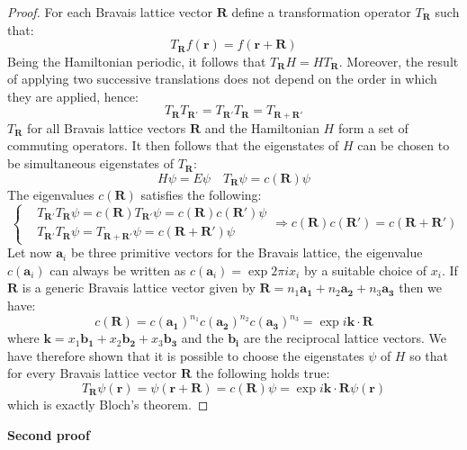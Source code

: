 \documentclass[10.75pt,a4paper,openright,bottom=2cm]{article}
\renewcommand{\Vec}[1]{\boldsymbol{#1}}
\begin{document}
\begin{proof}
For each Bravais lattice vector $\Vec{R}$ define a transformation operator $T_{\Vec{R}}$ such that:
\[
T_{\Vec{R}}f(\Vec{r})=f(\Vec{r}+\Vec{R})
\]
Being the Hamiltonian periodic, it follows that $T_{\Vec{R}}H=HT_{\Vec{R}}$. Moreover, the result of applying two successive translations does not depend on the order in which they are applied, hence:
\[
T_{\Vec{R}}T_{\Vec{R'}}=T_{\Vec{R'}}T_{\Vec{R}}=T_{\Vec{R}+\Vec{R'}}
\]
$T_{\Vec{R}}$ for all Bravais lattice vectors $\Vec{R}$ and the Hamiltonian $H$ form a set of commuting operators. It then follows that the eigenstates of $H$ can be chosen to be simultaneous eigenstates of $T_{\Vec{R}}$:
\[
H\psi=E\psi \quad T_{\Vec{R}}\psi=c(\Vec{R})\psi
\]
The eigenvalues $c(\Vec{R})$ satisfies the following:
\[
\left\{
\begin{aligned}
&T_{\Vec{R}'}T_{\Vec{R}}\psi=c(\Vec{R})T_{\Vec{R}'}\psi=c(\Vec{R})c(\Vec{R}')\psi\\
&T_{\Vec{R}'}T_{\Vec{R}}\psi=T_{\Vec{R}+\Vec{R}'}\psi=c(\Vec{R}+\Vec{R}')\psi
\end{aligned}
\right.
\Rightarrow
c(\Vec{R})c(\Vec{R}')=c(\Vec{R}+\Vec{R}')
\]
Let now $\Vec{a}_i$ be three primitive vectors for the Bravais lattice, the eigenvalue $c(\Vec{a}_i)$ can always be written as $c(\Vec{a}_i)=\exp{2\pi ix_i}$ by a suitable choice of $x_i$. If $\Vec{R}$ is a generic Bravais lattice vector given by $\Vec{R}=n_1\Vec{a_1}+n_2\Vec{a_2}+n_3\Vec{a_3}$ then we have:
\[
c(\Vec{R})=c(\Vec{a_1})^{n_1}c(\Vec{a_2})^{n_2}c(\Vec{a_3})^{n_3}=\exp{i\Vec{k}\cdot\Vec{R}}
\]
where $\Vec{k}=x_1\Vec{b_1}+x_2\Vec{b_2}+x_3\Vec{b_3}$ and the $\Vec{b_i}$ are the reciprocal lattice vectors. We have therefore shown that it is possible to choose the eigenstates $\psi$ of $H$ so that for every Bravais lattice vector $\Vec{R}$ the following holds true:
\[
T_{\Vec{R}}\psi(\Vec{r})=\psi(\Vec{r}+\Vec{R})=c(\Vec{R})\psi=\exp{i\Vec{k}\cdot\Vec{R}}\psi(\Vec{r})
\]
which is exactly Bloch's theorem.
\end{proof}
\noindent\textbf{Second proof}
\end{document}
